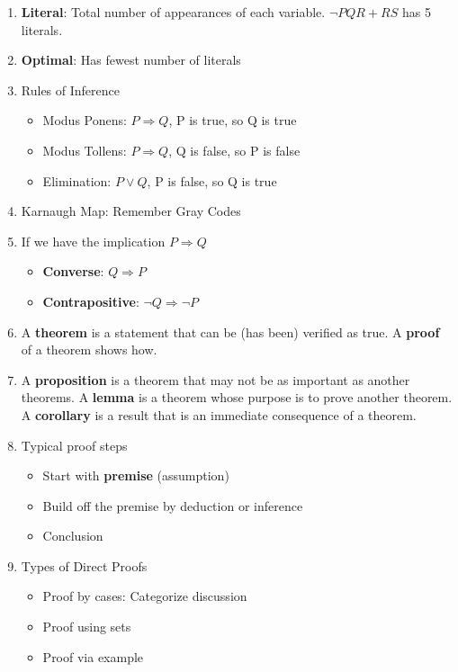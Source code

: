 \documentclass[]{article}
\begin{document}
\begin{multicols}{2}
\begin{enumerate}
\begin{itemize}
    \end{itemize}
  \item \textbf{Literal}: Total number of appearances of each variable. $\neg PQR+RS$ has 5 literals.
  \item \textbf{Optimal}: Has fewest number of literals
  \item Rules of Inference
    \begin{itemize}
      \item Modus Ponens: $P \Rightarrow Q$, P is true, so Q is true
      \item Modus Tollens: $P \Rightarrow Q$, Q is false, so P is false
      \item Elimination: $P \lor Q$, P is false, so Q is true
    \end{itemize}
  \item Karnaugh Map: Remember Gray Codes
  \item If we have the implication $P \Rightarrow Q$
    \begin{itemize}
      \item \textbf{Converse}: $Q \Rightarrow P$
      \item \textbf{Contrapositive}: $\neg Q \Rightarrow \neg P$
    \end{itemize}
  \item A \textbf{theorem} is a statement that can be (has been) verified as true. A \textbf{proof} of a theorem shows how.
  \item A \textbf{proposition} is a theorem that may not be as important as another theorems. A \textbf{lemma} is a theorem whose purpose is to prove another theorem. A \textbf{corollary} is a result that is an immediate consequence of a theorem.
  \item Typical proof steps
    \begin{itemize}
      \item Start with \textbf{premise} (assumption)
      \item Build off the premise by deduction or inference
      \item Conclusion
    \end{itemize}
  \item Types of Direct Proofs
    \begin{itemize}
      \item Proof by cases: Categorize discussion
      \item Proof using sets
      \item Proof via example
    \end{itemize}

\end{enumerate}
\end{multicols}
\end{document}
